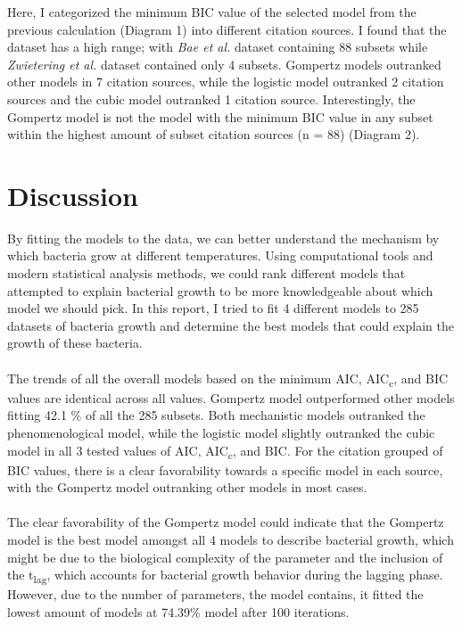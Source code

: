 \documentclass[11pt]{article}
\begin{document}
    Here, I categorized the minimum BIC value of the selected model from the previous calculation (Diagram 1) into different citation sources. 
    I found that the dataset has a high range; with \textit{Bae et al.} dataset containing 88 subsets while \textit{Zwietering et al.} dataset contained only 4 subsets.
    Gompertz models outranked other models in 7 citation sources, while the logistic model outranked 2 citation sources and the cubic model outranked 1 citation source.
    Interestingly, the Gompertz model is not the model with the minimum BIC value in any subset within the highest amount of subset citation sources (n = 88) (Diagram 2).


    \section{Discussion}
    By fitting the models to the data, we can better understand the mechanism by which bacteria grow at different temperatures.
    Using computational tools and modern statistical analysis methods, we could rank different models that attempted to explain bacterial growth to be more knowledgeable about which model we should pick.
    In this report, I tried to fit 4 different models to 285 datasets of bacteria growth and determine the best models that could explain the growth of these bacteria.
    \\
    \\
    The trends of all the overall models based on the minimum AIC, AIC\textsubscript{c}, and BIC values are identical across all values.
    Gompertz model outperformed other models fitting 42.1 \% of all the 285 subsets. 
    Both mechanistic models outranked the phenomenological model, while the logistic model slightly outranked the cubic model in all 3 tested values of AIC, AIC\textsubscript{c}, and BIC.
    For the citation grouped of BIC values, there is a clear favorability towards a specific model in each source, with the Gompertz model outranking other models in most cases. 
    \\
    \\
    The clear favorability of the Gompertz model could indicate that the Gompertz model is the best model amongst all 4 models to describe bacterial growth, which might be due to the biological complexity of the parameter and the inclusion of the t\textsubscript{lag}, which accounts for bacterial growth behavior during the lagging phase.
    However, due to the number of parameters, the model contains, it fitted the lowest amount of models at 74.39\% model after 100 iterations.
\end{document}
